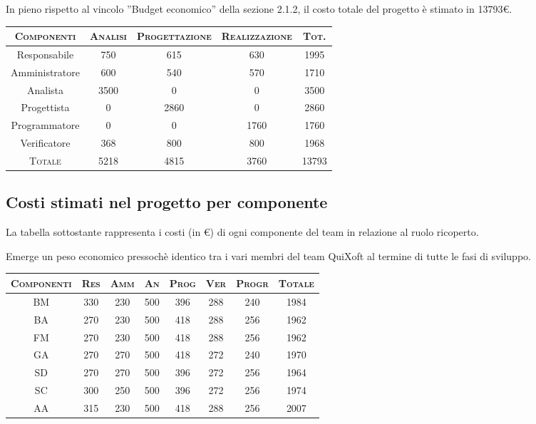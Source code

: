 \documentclass[11pt,a4paper]{article}
\begin{document}
In pieno rispetto al vincolo ''Budget economico'' della sezione 2.1.2, il costo totale del progetto è stimato in 13793\euro.
\begin{center}
\begin{tabular}{|c||c|c|c||c|}
\hline
\textsc{Componenti}& \textsc{Analisi} & \textsc{Progettazione} & \textsc{Realizzazione} & \textsc{Tot.} \\ \hline \hline
Responsabile & 750 & 615 & 630 & 1995 \\ \hline
Amministratore & 600 & 540 & 570 & 1710 \\ \hline
Analista & 3500 & 0 & 0 & 3500 \\ \hline
Progettista & 0 & 2860 & 0 & 2860 \\ \hline
Programmatore & 0 & 0 & 1760 & 1760 \\ \hline
Verificatore & 368 & 800 & 800 & 1968 \\ \hline \hline
\textsc{Totale} & 5218 & 4815 & 3760 & 13793 \\ \hline
\end{tabular}
\end{center}
\subsection{Costi stimati nel progetto per componente}
La tabella sottostante rappresenta i costi (in \euro) di ogni componente del team in relazione al ruolo ricoperto.

Emerge un peso economico pressochè identico tra i vari membri del team QuiXoft al termine di tutte le fasi di sviluppo.
\begin{center}
\begin{tabular}{|c||c|c|c|c|c|c||c|}
\hline
\textsc{Componenti} & \textsc{Res} & \textsc{Amm} & \textsc{An} & \textsc{Prog} & \textsc{Ver} & \textsc{Progr} & \textsc{Totale}\\
\hline \hline
BM & 330 & 230 & 500 & 396 & 288 & 240 & 1984 \\ \hline
BA & 270 & 230 & 500 & 418 & 288 & 256 & 1962 \\ \hline
FM & 270 & 230 & 500 & 418 & 288 & 256 & 1962 \\ \hline
GA & 270 & 270 & 500 & 418 & 272 & 240 & 1970 \\ \hline
SD & 270 & 270 & 500 & 396 & 272 & 256 & 1964 \\ \hline
SC & 300 & 250 & 500 & 396 & 272 & 256 & 1974 \\ \hline
AA & 315 & 230 & 500 & 418 & 288 & 256 & 2007 \\ \hline
\end{tabular}
\end{center}
\newpage
\end{document}
